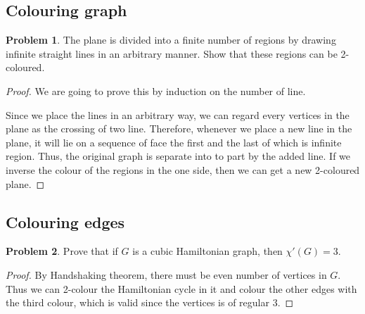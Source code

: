 \documentclass[a4paper,11pt]{article}%
\theoremstyle{remark}
\theoremstyle{definition}
\newtheorem{problem}{Problem}[subsection]
\begin{document}
\subsection{Colouring graph}
\begin{problem}
    The plane is divided into a finite number of regions by drawing infinite straight lines in an arbitrary manner. Show that 
    these regions can be 2-coloured.
\begin{proof}
We are going to prove this by induction on the number of line.

Since we place the lines in an arbitrary way, we can regard every vertices in the plane as the 
crossing of two line.
Therefore, whenever we place a new line in the plane, it will lie on a sequence of face the first and the last of which is infinite 
region. Thus, the original graph is separate into to part by the added line. If we inverse the colour of the regions in the one side,
then we can get a new 2-coloured plane.
\end{proof}
\end{problem}
\subsection{Colouring edges}
\begin{problem}
    Prove that if $G$ is a cubic Hamiltonian graph, then $\chi'(G)=3$.
    \begin{proof}
        By Handshaking theorem, there must be even number of vertices in $G$. Thus 
        we can 2-colour the Hamiltonian cycle in it and colour the other edges 
        with the third colour, which is valid since the vertices is of regular 3.
    \end{proof}
\end{problem}
\end{document}

